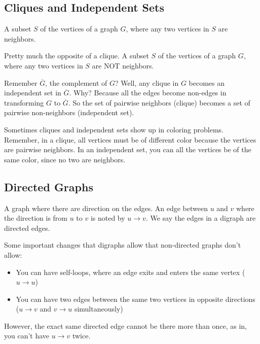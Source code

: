 \documentclass[11pt]{scrartcl}
\begin{document}
\subsection{Cliques and Independent Sets}

\begin{definition}[Clique]
A subset $S$ of the vertices of a graph $G$, where any two vertices in $S$ are neighbors.
\end{definition}

\begin{definition}
Pretty much the opposite of a clique. A subset $S$ of the vertices of a graph $G$, where any two vertices in $S$ are NOT neighbors.
\end{definition}

Remember $\overline{G}$, the complement of $G$? Well, any clique in $G$ becomes an independent set in $\overline{G}$. Why? Because all the edges become non-edges in transforming $G$ to $\overline{G}$. So the set of pairwise neighbors (clique) becomes a set of pairwise non-neighbors (independent set).

\begin{advice}
Sometimes cliques and independent sets show up in coloring problems. Remember, in a clique, all vertices must be of different color because the vertices are pairwise neighbors. In an independent set, you can all the vertices be of the same color, since no two are neighbors.
\end{advice}

\subsection{Directed Graphs}

\begin{definition}[Digraph]
A graph where there are direction on the edges. An edge between $u$ and $v$ where the direction is from $u$ to $v$ is noted by $u \rightarrow v$. We say the edges in a digraph are directed edges.
\end{definition}
Some important changes that digraphs allow that non-directed graphs don't allow:
\begin{itemize}
\item You can have self-loops, where an edge exits and enters the same vertex ($u \rightarrow u$)
\item You can have two edges between the same two vertices in opposite directions ($u \rightarrow v$ and $v \rightarrow u$ simultaneously)
\end{itemize}
However, the exact same directed edge cannot be there more than once, as in, you can't have $u \rightarrow v$ twice.
\end{document}
